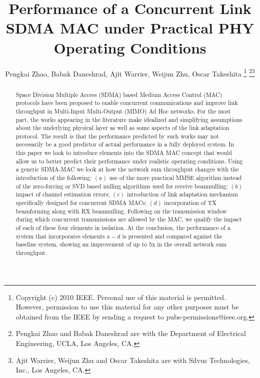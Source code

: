 \documentclass[journal, final]{IEEEtran}
\begin{document}
\title{Performance of a Concurrent Link SDMA MAC under Practical PHY
Operating Conditions}


\author{Pengkai Zhao, Babak Daneshrad, Ajit Warrier, Weijun Zhu,
        Oscar Takeshita \thanks{Copyright (c) 2010 IEEE. Personal use of this material is permitted.
        However, permission to use this material for any other purposes must be obtained from the
        IEEE by sending a request to pubs-permissions@ieee.org.}
  \thanks{Pengkai Zhao and Babak Daneshrad are with the Department
 of Electrical Engineering, UCLA, Los Angeles, CA.}\thanks{Ajit Warrier, Weijun Zhu and Oscar Takeshita are with Silvus Technologies, Inc., Los Angeles, CA.}}



















\maketitle


\begin{abstract}
Space Division Multiple Access (SDMA) based Medium Access Control (MAC)
protocols have been proposed to enable concurrent communications and improve
link throughput in Multi-Input Multi-Output (MIMO) Ad Hoc networks. For the
most part, the works appearing in the literature make idealized and
simplifying assumptions about the underlying physical layer as well as some
aspects of the link adaptation protocol. The result is that the performance
predicted by such works may not necessarily be a good predictor of actual
performance in a fully deployed system. In this paper we look to introduce
elements into the SDMA MAC concept that would allow us to better predict
their performance under realistic operating conditions. Using a generic
SDMA-MAC we look at how the network sum throughput changes with the
introduction of the following: $(a)$ use of the more practical MMSE algorithm
instead of the zero-forcing or SVD based nulling algorithms used for receive
beamnulling; $(b)$ impact of channel estimation errors; $(c)$ introduction of link
adaptation mechanism specifically designed for concurrent SDMA MACs; $(d)$
incorporation of TX beamforming along with RX beamnulling. Following on the
transmission window during which concurrent transmissions are allowed by the
MAC, we qualify the impact of each of these four elements in isolation. At
the conclusion, the performance of a system that incorporates elements $a-d$ is
presented and compared against the baseline system, showing an improvement
of up to 5x in the overall network sum throughput.
\end{abstract}
\end{document}

